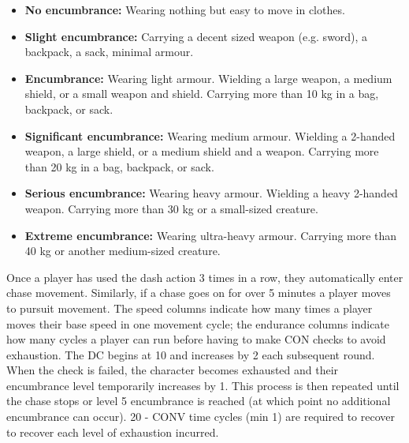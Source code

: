 \documentclass[letterpaper,12pt]{article}
\begin{document}
\begin{itemize}
\item \textbf{No encumbrance:} Wearing nothing but easy to move in clothes.
\item \textbf{Slight encumbrance:} Carrying a decent sized weapon (e.g. sword), a backpack, a sack, minimal armour.
\item \textbf{Encumbrance:} Wearing light armour. Wielding a large weapon, a medium shield, or a small weapon and shield. Carrying more than 10 kg in a bag, backpack, or sack. 
\item \textbf{Significant encumbrance:} Wearing medium armour. Wielding a 2-handed weapon, a large shield, or a medium shield and a weapon. Carrying more than 20 kg in a bag, backpack, or sack.
\item \textbf{Serious encumbrance:} Wearing heavy armour. Wielding a heavy 2-handed weapon. Carrying more than 30 kg or a small-sized creature.
\item \textbf{Extreme encumbrance:} Wearing ultra-heavy armour. Carrying more than 40 kg or another medium-sized creature.
\end{itemize}
 
Once a player has used the dash action 3 times in a row, they automatically enter chase movement. Similarly, if a chase goes on for over 5 minutes a player moves to pursuit movement. The speed columns indicate how many times a player moves their base speed in one movement cycle; the endurance columns indicate how many cycles a player can run before having to make CON checks to avoid exhaustion. The DC begins at 10 and increases by 2 each subsequent round. When the check is failed, the character becomes exhausted and their encumbrance level temporarily increases by 1. This process is then repeated until the chase stops or level 5 encumbrance is reached (at which point no additional encumbrance can occur). 20 - CONV time cycles (min 1) are required to recover to recover each level of exhaustion incurred.   
 
\end{document}

